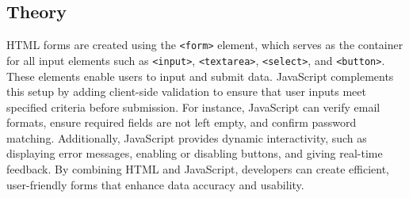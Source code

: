 \documentclass[a4paper,9pt]{article}
\begin{document}
\subsection{Theory}
HTML forms are created using the \texttt{\textless form\textgreater} element, which serves as the container for all input elements such as \texttt{\textless input\textgreater}, \texttt{\textless textarea\textgreater}, \texttt{\textless select\textgreater}, and \texttt{\textless button\textgreater}. These elements enable users to input and submit data. JavaScript complements this setup by adding client-side validation to ensure that user inputs meet specified criteria before submission. For instance, JavaScript can verify email formats, ensure required fields are not left empty, and confirm password matching. Additionally, JavaScript provides dynamic interactivity, such as displaying error messages, enabling or disabling buttons, and giving real-time feedback. By combining HTML and JavaScript, developers can create efficient, user-friendly forms that enhance data accuracy and usability.
\end{document}
